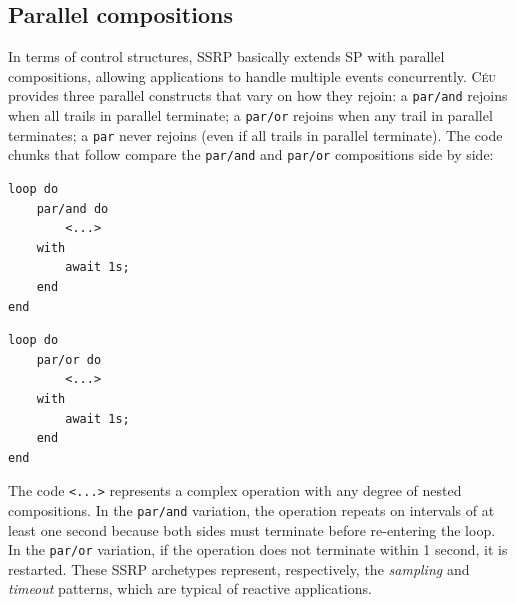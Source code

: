 \documentclass{acm_proc_article-sp}
\newcommand{\CEU}{\textsc{C\'{e}u}\xspace}
\newcommand{\code}[1] {{\small{\texttt{#1}}}}
\newcommand{\1}{\;}
\newcommand{\2}{\;\;}
\newcommand{\3}{\;\;\;}
\newcommand{\5}{\;\;\;\;\;}
\begin{document}


\subsection{Parallel compositions}
\label{sec.ceu.par}

In terms of control structures, SSRP basically extends SP with parallel 
compositions, allowing applications to handle multiple events concurrently.
%
\CEU provides three parallel constructs that vary on how they rejoin:
a \code{par/and} rejoins when all trails in parallel terminate;
a \code{par/or} rejoins when any trail in parallel terminates;
a \code{par} never rejoins (even if all trails in parallel terminate).
%
The code chunks that follow compare the \code{par/and} and \code{par/or} 
compositions side by side:

\begin{minipage}[t]{0.40\linewidth}
\begin{lstlisting}
loop do
    par/and do
        <...>
    with
        await 1s;
    end
end
\end{lstlisting}
\end{minipage}
%
\begin{minipage}[t]{0.40\linewidth}
\begin{lstlisting}
loop do
    par/or do
        <...>
    with
        await 1s;
    end
end
\end{lstlisting}
\end{minipage}

The code \code{<...>} represents a complex operation with any degree of nested 
compositions.
%
In the \code{par/and} variation, the operation repeats on intervals of at least 
one second because both sides must terminate before re-entering the loop.
In the \code{par/or} variation, if the operation does not terminate within 1 
second, it is restarted.
%
These SSRP archetypes represent, respectively, the \emph{sampling} and 
\emph{timeout} patterns, which are typical of reactive applications.
\end{document}
